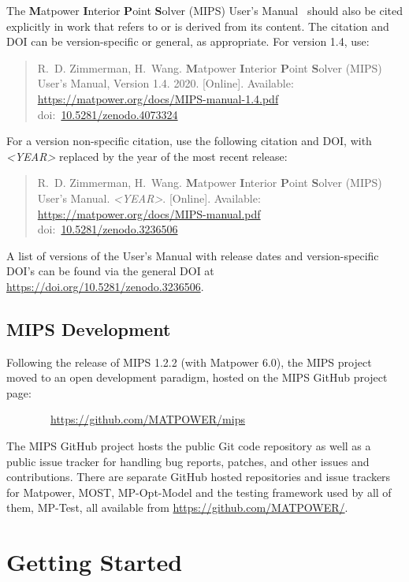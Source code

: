 \documentclass[12pt]{article}
\newcommand{\matpower}[0]{{\sc Matpower}}
\newcommand{\mptest}[0]{{MP-Test}}
\newcommand{\mips}[0]{{MIPS}}
\newcommand{\mipsurl}[0]{https://github.com/MATPOWER/mips}
\newcommand{\mipsname}[0]{{{\bf M}{\sc atpower} \textbf{I}nterior \textbf{P}oint \textbf{S}olver}}
\newcommand{\mpom}[0]{\mbox{MP-Opt-Model}}
\newcommand{\most}[0]{{MOST}}
\newcommand{\doi}[1]{doi:~\href{https://doi.org/#1}{#1}}
\numberwithin{equation}{section}
\numberwithin{table}{section}
\numberwithin{figure}{section}
\begin{document}
The \mipsname{} (\mips{}) User's Manual~\cite{mips_manual} should also be cited explicitly
in work that refers to or is derived from its content. The citation and
DOI can be version-specific or general, as appropriate. For version 1.4,
use:

\begin{quote}
\footnotesize
R.~D. Zimmerman, H.~Wang. \mipsname{} (\mips{}) User's Manual, Version 1.4. 2020. [Online]. Available: \url{https://matpower.org/docs/MIPS-manual-1.4.pdf}\\
\doi{10.5281/zenodo.4073324}
\end{quote}
For a version non-specific citation, use the following citation and DOI,
with \emph{\textless{}YEAR\textgreater{}} replaced by the year of the most recent release:

\begin{quote}
\footnotesize
R.~D. Zimmerman, H.~Wang. \mipsname{} (\mips{}) User's Manual. \emph{\textless{}YEAR\textgreater{}}.
[Online]. Available: \url{https://matpower.org/docs/MIPS-manual.pdf}\\
\doi{10.5281/zenodo.3236506}
\end{quote}
A list of versions of the User's Manual with release dates and
version-specific DOI's can be found via the general DOI at
\url{https://doi.org/10.5281/zenodo.3236506}.

\subsection{\mips{} Development}
\label{sec:development}

Following the release of \mips{} 1.2.2 (with \matpower{} 6.0), the \mips{} project moved to an open development paradigm, hosted on the \mips{} GitHub project page:

\bigskip

~~~~~~~~\url{\mipsurl}

\bigskip

The \mips{} GitHub project hosts the public Git code repository as well as a public issue tracker for handling bug reports, patches, and other issues and contributions. There are separate GitHub hosted repositories and issue trackers for \matpower{}, \most{}, \mpom{} and the testing framework used by all of them, \mptest{}, all available from \url{https://github.com/MATPOWER/}.


\section{Getting Started}
\end{document}
